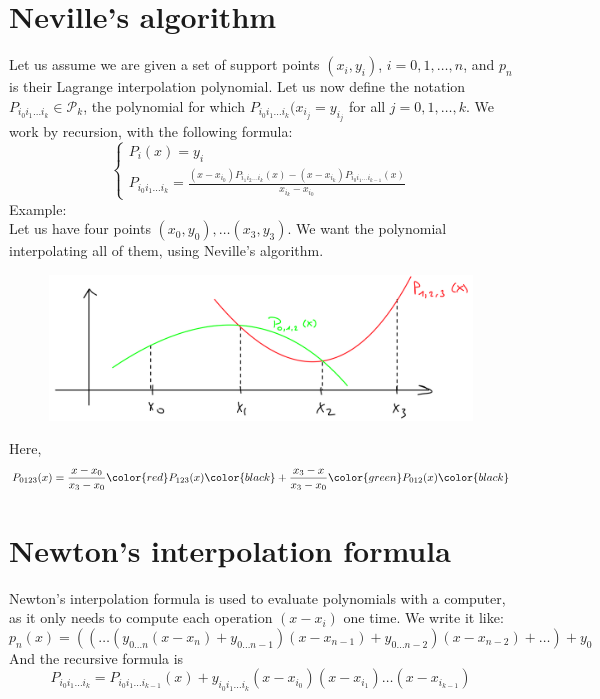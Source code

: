 \documentclass[12pt, openany]{report}
\theoremstyle{definition}
\begin{document}
\section{Neville's algorithm}
Let us assume we are given a set of support points \((x_i,y_i)\), \(i=0,1,\dots,n\), and \(p_n\) is their Lagrange interpolation polynomial. Let us now define the notation \(P_{i_0i_1\dots i_k}\in \mathcal{P}_k\), the polynomial for which \(P_{i_0i_1\dots i_k}(x_{i_j}=y_{i_j}\)  for all \(j=0,1,\dots,k\). We work by recursion, with the following formula:
\begin{equation}
    \begin{cases}
        P_i(x) = y_i\\
        P_{i_0i_1\dots i_k} = \frac{(x-x_{i_0})P_{i_1i_2\dots i_k}(x) - (x-x_{i_k})P_{i_0i_1\dots i_{k-1}}(x)}{x_{i_k}-x_{i_0}}
    \end{cases}
\end{equation}
Example:\\
Let us have four points \((x_0,y_0),\dots(x_3,y_3)\). We want the polynomial interpolating all of them, using Neville's algorithm. 
\begin{figure}[H]
    \centering
    \includegraphics[width=0.5\linewidth]{img/neville.png}
\end{figure}
Here, 
\begin{equation}
    P_{0123}(x) = \frac{x-x_0}{x_3-x_0}\color{red}P_{123}(x)\color{black}+\frac{x_3-x}{x_3-x_0}\color{green}P_{012}(x)\color{black}
\end{equation}
\section{Newton's interpolation formula}
Newton's interpolation formula is used to evaluate polynomials with a computer, as it only needs to compute each operation \((x-x_i)\) one time. We write it like:
\begin{equation}
    p_n(x) = \left(\left(\dots\left(y_{0\dots n}(x-x_n)+y_{0\dots n-1}\right)(x-x_{n-1})+y_{0\dots n-2}\right)(x-x_{n-2})+\dots\right) + y_0
\end{equation}
And the recursive formula is
\begin{equation}
    P_{i_0i_1\dots i_k}= P_{i_0i_1\dots i_{k-1}}(x) + y_{i_0i_1\dots i_k}(x-x_{i_0})(x-x_{i_1})\dots(x-x_{i_{k-1}})
\end{equation}
\end{document}
